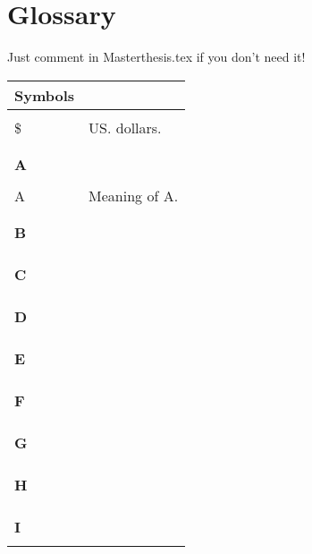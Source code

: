 \chapter{Glossary}
\label{appendixA}
Just comment \verb|| in Masterthesis.tex if you don't need it!

\begin{longtable}{p{2.5cm}p{9.5cm}}

\huge{\textbf{Symbols}}& \\
\hline
\\
\$ & US. dollars. \\
\\
\\
\huge{\textbf{A}}& \\
\hline
\\
A& Meaning of A.\\
\\
\\
\huge{\textbf{B}}& \\
\hline
\\

\\
\\
\huge{\textbf{C}}& \\
\hline
\\

\\
\\
\huge{\textbf{D}}& \\
\hline
\\

\\
\\
\huge{\textbf{E}}& \\
\hline
\\

\\
\\
\huge{\textbf{F}}& \\
\hline
\\

\\
\\
\huge{\textbf{G}}& \\
\hline
\\
\\
\\
\huge{\textbf{H}}& \\
\hline
\\

\\
\\
\huge{\textbf{I}}& \\
\hline
\\


\end{longtable}
